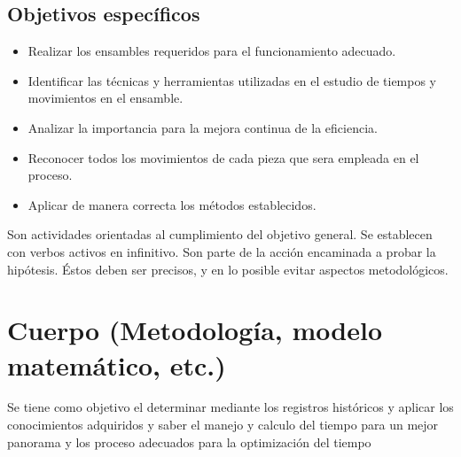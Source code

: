 \subsection{Objetivos específicos }

\begin{itemize}
    \item Realizar los ensambles requeridos para el funcionamiento adecuado.
    \item Identificar las técnicas y herramientas utilizadas en el estudio de tiempos y movimientos en el ensamble.
    \item Analizar la importancia  para la mejora continua de la eficiencia.
    \item Reconocer todos los movimientos de cada pieza que sera empleada en el proceso.
    \item Aplicar de manera correcta los métodos establecidos.
\end{itemize}

Son actividades orientadas al cumplimiento del objetivo general. Se establecen con verbos activos en infinitivo. Son parte de la acción encaminada a probar la hipótesis. Éstos deben ser precisos, y en lo posible evitar aspectos metodológicos.
% 
% 
\section{Cuerpo (Metodología, modelo matemático, etc.)}

Se tiene como objetivo el determinar mediante los registros históricos y aplicar los conocimientos adquiridos y saber el manejo y calculo del tiempo para un mejor panorama  y los proceso adecuados para la optimización del tiempo


